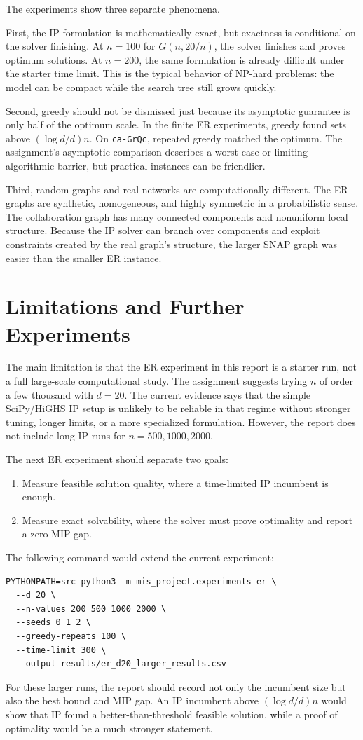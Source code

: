 \documentclass[11pt]{article}
\begin{document}
The experiments show three separate phenomena.

First, the IP formulation is mathematically exact, but exactness is conditional
on the solver finishing. At $n=100$ for $G(n,20/n)$, the solver finishes and
proves optimum solutions. At $n=200$, the same formulation is already difficult
under the starter time limit. This is the typical behavior of NP-hard problems:
the model can be compact while the search tree still grows quickly.

Second, greedy should not be dismissed just because its asymptotic guarantee is
only half of the optimum scale. In the finite ER experiments, greedy found sets
above $(\log d/d)n$. On \texttt{ca-GrQc}, repeated greedy matched the optimum.
The assignment's asymptotic comparison describes a worst-case or limiting
algorithmic barrier, but practical instances can be friendlier.

Third, random graphs and real networks are computationally different. The ER
graphs are synthetic, homogeneous, and highly symmetric in a probabilistic
sense. The collaboration graph has many connected components and nonuniform
local structure. Because the IP solver can branch over components and exploit
constraints created by the real graph's structure, the larger SNAP graph was
easier than the smaller ER instance.

\section{Limitations and Further Experiments}

The main limitation is that the ER experiment in this report is a starter run,
not a full large-scale computational study. The assignment suggests trying $n$
of order a few thousand with $d=20$. The current evidence says that the simple
SciPy/HiGHS IP setup is unlikely to be reliable in that regime without stronger
tuning, longer limits, or a more specialized formulation. However, the report
does not include long IP runs for $n=500,1000,2000$.

The next ER experiment should separate two goals:
\begin{enumerate}[leftmargin=*]
  \item Measure feasible solution quality, where a time-limited IP incumbent is
  enough.
  \item Measure exact solvability, where the solver must prove optimality and
  report a zero MIP gap.
\end{enumerate}
The following command would extend the current experiment:
\begin{lstlisting}[style=commands]
PYTHONPATH=src python3 -m mis_project.experiments er \
  --d 20 \
  --n-values 200 500 1000 2000 \
  --seeds 0 1 2 \
  --greedy-repeats 100 \
  --time-limit 300 \
  --output results/er_d20_larger_results.csv
\end{lstlisting}
For these larger runs, the report should record not only the incumbent size but
also the best bound and MIP gap. An IP incumbent above $(\log d/d)n$ would show
that IP found a better-than-threshold feasible solution, while a proof of
optimality would be a much stronger statement.
\end{document}
